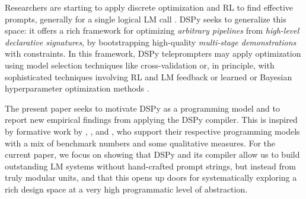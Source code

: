Researchers are starting to apply discrete optimization and RL to find effective prompts, generally for a single logical LM call \citep{guo2023connecting,pryzant2023automatic,huang2022large,yang2023large}.
DSPy seeks to generalize this space: it offers a rich framework for optimizing \textit{arbitrary pipelines} from \textit{high-level declarative signatures}, by bootstrapping high-quality \textit{multi-stage demonstrations} with constraints. In this framework, DSPy teleprompters may apply optimization using model selection techniques like cross-validation or, in principle, with sophisticated techniques involving RL and LM feedback
\citep{hu2023enabling,zhao2023expel,shinn2023reflexion}
or learned or Bayesian hyperparameter optimization methods
\citep{bergstra2013making,akiba2019optuna}.

The present paper seeks to motivate DSPy as a programming model and to report new empirical findings from applying the DSPy compiler. This is inspired by formative work by
\citet{bergstra2010theano,bergstra2013making},
\citet{pytorch2019},
and
\citet{wolf2020transformers}, who
support their respective programming models with a mix of benchmark numbers and some qualitative measures. For the current paper, we focus on showing that DSPy and its compiler allow us to build outstanding LM systems without hand-crafted prompt strings, but instead from truly modular units, and that this opens up doors for systematically exploring a rich design space at a very high programmatic level of abstraction. %
